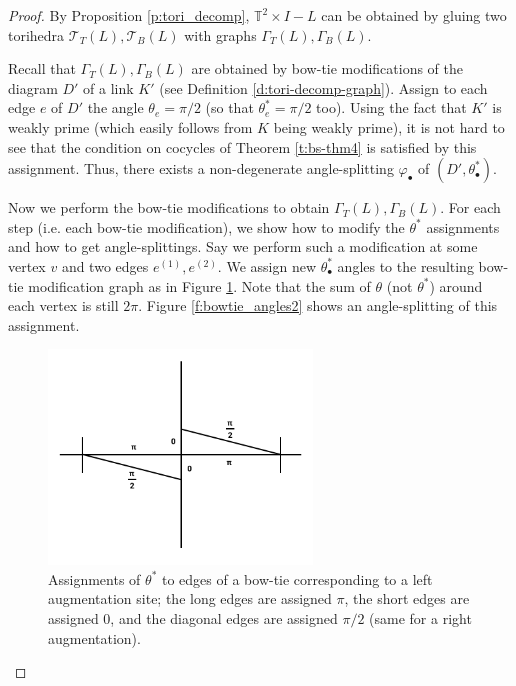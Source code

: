 \documentclass[11pt]{amsart}
\newcommand{\thmref}[1]{Theorem \ref{#1}}
\newcommand{\prpref}[1]{Proposition \ref{#1}}
\newcommand{\defref}[1]{Definition \ref{#1}}
\newcommand{\figref}[1]{Figure \ref{#1}}
\newcommand{\torus}{{\mathbb{T}^2}}
\newcommand{\sT}{{\mathcal{T}}}
\newcommand{\vphi}{\varphi}
\newcommand{\toruscomp}[1]{{\torus \times I - #1}}
\theoremstyle{plain}
\theoremstyle{definition}
\begin{document}
\begin{proof}
By \prpref{p:tori_decomp}, $\toruscomp{L}$ can be
obtained by gluing two torihedra $\sT_T(L),\sT_B(L)$
with graphs $\Gamma_T(L),\Gamma_B(L)$.


Recall that $\Gamma_T(L),\Gamma_B(L)$ are
obtained by bow-tie modifications of the diagram $D'$
of a link $K'$
(see \defref{d:tori-decomp-graph}).
Assign to each edge $e$ of $D'$ the angle $\theta_e = \pi/2$
(so that $\theta_e^* = \pi/2$ too).
Using the fact that $K'$ is weakly prime
(which easily follows from $K$ being weakly prime),
it is not hard to see that the condition on cocycles
of \thmref{t:bs-thm4} is satisfied by this assignment.
Thus, there exists a non-degenerate angle-splitting
$\vphi_\bullet$ of $(D',\theta_\bullet^*)$.


Now we perform the bow-tie modifications to obtain
$\Gamma_T(L),\Gamma_B(L)$.
For each step (i.e. each bow-tie modification),
we show how to modify the $\theta^*$ assignments
and how to get angle-splittings.
Say we perform such a modification
at some vertex $v$ and two edges $e^{(1)},e^{(2)}$.
We assign new $\theta_\bullet^*$ angles to
the resulting bow-tie modification graph
as in \figref{f:bowtie_angles}.
Note that the sum of $\theta$ (not $\theta^*$)
around each vertex is still $2\pi$.
\figref{f:bowtie_angles2} shows an angle-splitting
of this assignment.


\begin{figure}
\includegraphics[width=7cm]{more_pictures/horizontal_bowtie.png}
\caption{Assignments of $\theta^*$ to edges of a bow-tie
	corresponding to a left augmentation site;
	the long edges are assigned $\pi$,
	the short edges are assigned 0,
	and the diagonal edges are assigned $\pi/2$
	(same for a right augmentation).
	}
\label{f:bowtie_angles}
\end{figure}


\end{proof}
\end{document}
